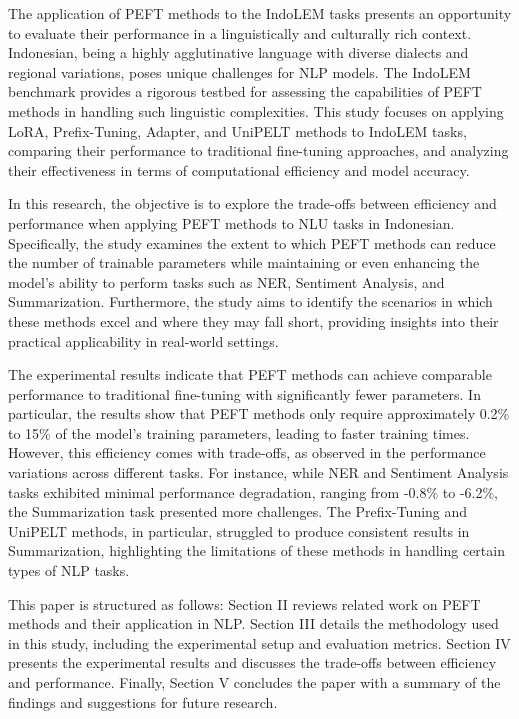 The application of PEFT methods to the IndoLEM tasks presents an opportunity to evaluate their performance in a linguistically and culturally rich context. Indonesian, being a highly agglutinative language with diverse dialects and regional variations, poses unique challenges for NLP models. The IndoLEM benchmark provides a rigorous testbed for assessing the capabilities of PEFT methods in handling such linguistic complexities. This study focuses on applying LoRA, Prefix-Tuning, Adapter, and UniPELT methods to IndoLEM tasks, comparing their performance to traditional fine-tuning approaches, and analyzing their effectiveness in terms of computational efficiency and model accuracy.

In this research, the objective is to explore the trade-offs between efficiency and performance when applying PEFT methods to NLU tasks in Indonesian. Specifically, the study examines the extent to which PEFT methods can reduce the number of trainable parameters while maintaining or even enhancing the model's ability to perform tasks such as NER, Sentiment Analysis, and Summarization. Furthermore, the study aims to identify the scenarios in which these methods excel and where they may fall short, providing insights into their practical applicability in real-world settings.

The experimental results indicate that PEFT methods can achieve comparable performance to traditional fine-tuning with significantly fewer parameters. In particular, the results show that PEFT methods only require approximately 0.2\% to 15\% of the model's training parameters, leading to faster training times. However, this efficiency comes with trade-offs, as observed in the performance variations across different tasks. For instance, while NER and Sentiment Analysis tasks exhibited minimal performance degradation, ranging from -0.8\% to -6.2\%, the Summarization task presented more challenges. The Prefix-Tuning and UniPELT methods, in particular, struggled to produce consistent results in Summarization, highlighting the limitations of these methods in handling certain types of NLP tasks.

This paper is structured as follows: Section II reviews related work on PEFT methods and their application in NLP. Section III details the methodology used in this study, including the experimental setup and evaluation metrics. Section IV presents the experimental results and discusses the trade-offs between efficiency and performance. Finally, Section V concludes the paper with a summary of the findings and suggestions for future research.
